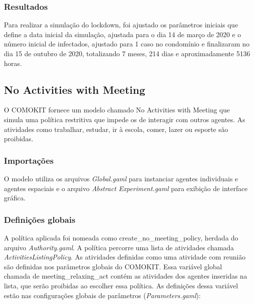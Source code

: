 
\subsubsection{Resultados}

Para realizar a simulação do lockdown, foi ajustado os parâmetros iniciais que define a data inicial da simulação, ajustada para o dia 14 de março de 2020 e o número inicial de infectados, ajustado para 1 caso no condomínio e finalizaram no dia 15 de outubro de 2020, totalizando 7 meses, 214 dias e aproximadamente 5136 horas.



\subsection{No Activities with Meeting}

O COMOKIT fornece um modelo chamado No Activities with Meeting que simula uma política restritiva que impede os de interagir com outros agentes. As atividades como trabalhar, estudar, ir à escola, comer, lazer ou esporte são proibidas.


\subsubsection{Importações}

O modelo utiliza os arquivos \textit{Global.gaml} para instanciar agentes individuais e agentes espaciais e o arquivo \textit{Abstract Experiment.gaml} para exibição de interface gráfica.

\subsubsection{Definições globais}

A política aplicada foi nomeada como create\_no\_meeting\_policy, herdada do arquivo \textit{Authority.gaml}. A política percorre uma lista de atividades chamada \textit{ActivitiesListingPolicy}. As atividades definidas como uma atividade com reunião são definidas nos parâmetros globais do COMOKIT. Essa variável global chamada de meeting\_relaxing\_act contém as atividades dos agentes inseridas na lista, que serão proibidas ao escolher essa política. As definições dessa variável estão nas configurações globais de parâmetros (\textit{Parameters.gaml}):

